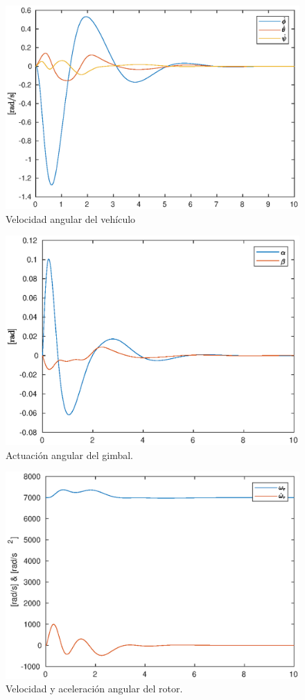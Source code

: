 \begin{figure}[!ht]
    \centering
    \includegraphics[width=0.6\linewidth]{fig/angvel_edf.eps}
    \caption{Velocidad angular del vehículo}
    \label{fig:angvel_edf.eps}
\end{figure}

\begin{figure}[!ht]
    \centering
    \includegraphics[width=0.6\linewidth]{fig/actuator_edf}
    \caption{Actuación angular del gimbal.}
    \label{fig:actuator_edf}
\end{figure}

\begin{figure}[!ht]
    \centering
    \includegraphics[width=0.6\linewidth]{fig/rotor_edf}
    \caption{Velocidad y aceleración angular del rotor.}
    \label{fig:rotor_edf}
\end{figure}



